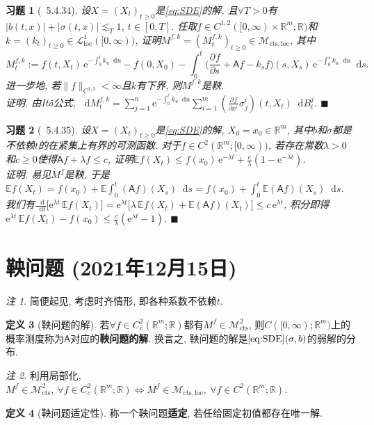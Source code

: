 \documentclass{ctexart}
\theoremstyle{definition}
\newtheorem{Def}{定义}[section]
\theoremstyle{remark}
\newtheorem{Rmk}[Def]{注}
\theoremstyle{plain}
\newtheorem{Ex}{习题}[section]
\newenvironment{Prf}{\vspace{1ex}\textbf{\\}{\color{red}\textit{证明}}.\normalfont}{\color{red}\hfill$\blacksquare$\vspace{1ex}\par}
\newcommand{\1}{\mathbbm{1}}				%
\newcommand{\E}{\mathbb{E}}					%
\newcommand{\abs}[1]{\lvert#1\rvert}			%
\newcommand{\norm}[1]{\lVert#1\rVert}
\newcommand{\R}{\mathbb{R}}					%
\renewcommand*{\d}{\mathop{}\!\mathrm{d}}	%
\newcommand{\pd}{\partial}					%
\newcommand{\p}[3][]{\frac{\pd^{#1}#2}{\pd{#3}^{#1}}}%
\newcommand{\e}{\mathrm{e}}
\begin{document}
\begin{Ex}[\cite{Karatzas-Shreve--GTM113}~5.4.34]
设$X = (X_{t})_{t \ge 0}$是\eqref{eq:SDE}的解, 且$\forall T > 0$有$\abs{b(t,x)}+\abs{\sigma(t,x)} \lesssim_{T} 1$, $t \in [0,T]$. 任取$f \in C^{1,2}([0,\infty)\times\R^{m};\R)$和$k = (k_{t})_{t \ge 0} \in \mathcal{L}^{1}_{\mathrm{loc}}([0,\infty))$, 证明$M^{f,k} = (M^{f,k}_{t})_{t \ge 0} \in \mathcal{M}_{\mathrm{cts},\mathrm{loc}}$, 其中
\[ M^{f,k}_{t} := f(t,X_{t}) \,\e^{-\int_{0}^{t} k_{u} \d u} - f(0,X_{0}) - \int_{0}^{t} \Big( \p{f}{s} + \mathsf{A}f - k_{s}f \Big)(s,X_{s}) \,\e^{-\int_{0}^{s} k_{u} \d u} \d s . \]
进一步地, 若$\norm{f}_{C^{1,2}} < \infty$且$k$有下界, 则$M^{f,k}$是鞅.
\begin{Prf}
由It\^{o}公式, $\d M^{f,k}_{t} = \sum_{j=1}^{n} \e^{-\int_{0}^{t} k_{u} \d u} \sum_{i=1}^{m} (\p{f}{x^i}\sigma^{i}_{j})(t,X_{t}) \d B^{j}_{t}$.
\end{Prf}
\end{Ex}


\begin{Ex}[\cite{Karatzas-Shreve--GTM113}~5.4.35]
设$X = (X_{t})_{t \ge 0}$是\eqref{eq:SDE}的解, $X_{0} = x_{0} \in \R^m$, 其中$b$和$\sigma$都是不依赖$t$的在紧集上有界的可测函数. 对于$f \in C^{2}(\R^{m};[0,\infty))$, 若存在常数$\lambda > 0$和$c \ge 0$使得$\mathsf{A}f + \lambda f \le c$, 证明$\E f(X_{t}) \le f(x_{0}) \,\e^{-\lambda t} + \frac{c}{\lambda} (1 - \e^{-\lambda t})$.
\begin{Prf}
易见$M^f$是鞅, 于是$\E f(X_{t}) = f(x_{0}) + \E \int_{0}^{t} (\mathsf{A}f)(X_{s}) \d s = f(x_{0}) + \int_{0}^{t} \E (\mathsf{A}f)(X_{s}) \d s$. 我们有$\frac{\d}{\d t}\big[ \e^{\lambda t} \,\E f(X_{t}) \big] = \e^{\lambda t} \big[ \lambda \,\E f(X_{t}) + \E (\mathsf{A}f)(X_{t}) \big] \le c \,\e^{\lambda t}$, 积分即得$\e^{\lambda t} \,\E f(X_{t}) - f(x_{0}) \le \frac{c}{\lambda} (\e^{\lambda t} - 1)$.
\end{Prf}
\end{Ex}



\section{鞅问题 \normalfont\footnotesize (2021年12月15日)}
\begin{Rmk}
简便起见, 考虑时齐情形, 即各种系数不依赖$t$.
\end{Rmk}

\begin{Def}[鞅问题的解]
若$\forall f \in C_{c}^{2}(\R^{m};\R)$都有$M^{f} \in \mathcal{M}_{\mathrm{cts}}^{2}$, 则$C([0,\infty);\R^{m})$上的概率测度称为$\mathsf{A}$对应的\textbf{鞅问题的解}. 换言之, 鞅问题的解是$\eqref{eq:SDE}(\sigma,b)$的弱解的分布.
\begin{Rmk}
利用局部化, $M^{f} \in \mathcal{M}_{\mathrm{cts}}^{2} ,\ \forall f \in C_{c}^{2}(\R^{m};\R) \iff M^{f} \in \mathcal{M}_{\mathrm{cts},\mathrm{loc}} ,\ \forall f \in C^{2}(\R^{m};\R)$.
\end{Rmk}
\end{Def}
\begin{Def}[鞅问题适定性]
称一个鞅问题\textbf{适定}, 若任给固定初值都存在唯一解.
\end{Def}
\end{document}
